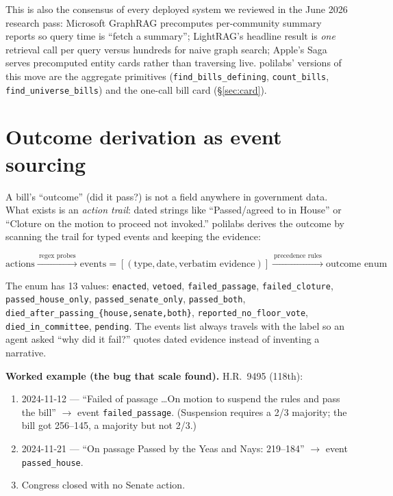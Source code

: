 \documentclass[11pt]{article}
\newcommand{\code}[1]{\texttt{#1}}
\begin{document}
This is also the consensus of every deployed system we reviewed in the June
2026 research pass: Microsoft GraphRAG precomputes per-community summary
reports so query time is ``fetch a summary''; LightRAG's headline result is
\emph{one} retrieval call per query versus hundreds for naive graph search;
Apple's Saga serves precomputed entity cards rather than traversing live.
polilabs' versions of this move are the aggregate primitives
(\code{find\_bills\_defining}, \code{count\_bills},
\code{find\_universe\_bills}) and the one-call bill card
(\S\ref{sec:card}).

\section{Outcome derivation as event sourcing}
\label{sec:eventsourcing}

A bill's ``outcome'' (did it pass?) is not a field anywhere in government
data. What exists is an \emph{action trail}: dated strings like ``Passed/agreed
to in House'' or ``Cloture on the motion to proceed not invoked.'' polilabs
derives the outcome by scanning the trail for typed events and keeping the
evidence:

\[
\text{actions} \xrightarrow{\ \text{regex probes}\ }
\text{events} = [(\text{type}, \text{date}, \text{verbatim evidence})]
\xrightarrow{\ \text{precedence rules}\ } \text{outcome enum}
\]

The enum has 13 values: \code{enacted}, \code{vetoed}, \code{failed\_passage},
\code{failed\_cloture}, \code{passed\_house\_only}, \code{passed\_senate\_only},
\code{passed\_both}, \code{died\_after\_passing\_\{house,senate,both\}},
\code{reported\_no\_floor\_vote}, \code{died\_in\_committee}, \code{pending}.
The events list always travels with the label so an agent asked ``why did it
fail?'' quotes dated evidence instead of inventing a narrative.

\textbf{Worked example (the bug that scale found).} H.R.~9495 (118th):

\begin{enumerate}[itemsep=1pt]
  \item 2024-11-12 --- ``Failed of passage \ldots On motion to suspend the
        rules and pass the bill'' $\to$ event \code{failed\_passage}.
        (Suspension requires a 2/3 majority; the bill got 256--145, a
        majority but not 2/3.)
  \item 2024-11-21 --- ``On passage Passed by the Yeas and Nays: 219--184''
        $\to$ event \code{passed\_house}.
  \item Congress closed with no Senate action.
\end{enumerate}
\end{document}
